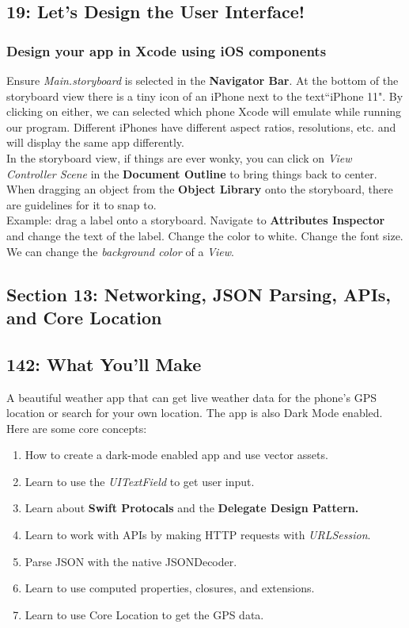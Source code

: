 \documentclass[12pt, letterpaper]{article}
\begin{document}
\subsection*{19: Let's Design the User Interface!}

\subsubsection*{Design your app in Xcode using iOS components}

Ensure \emph{Main.storyboard} is selected in the \textbf{Navigator Bar}. At the bottom of the storyboard
view there is a tiny icon of an iPhone next to the text``iPhone 11". By clicking on either, we can
selected which phone Xcode will emulate while running our program. Different iPhones have different
aspect ratios, resolutions, etc. and will display the same app differently. \\

In the storyboard view, if things are ever wonky, you can click on \emph{View Controller Scene} in the
\textbf{Document Outline} to bring things back to center. When dragging an object from the
\textbf{Object Library} onto the storyboard, there are guidelines for it to snap to. \\ 

Example: drag a label onto a storyboard. Navigate to \textbf{Attributes Inspector} and change the
text of the label. Change the color to white. Change the font size. We can change the \emph{background
color} of a \emph{View}.

\subsection*{Section 13: Networking, JSON Parsing, APIs, and Core Location}

\subsection*{142: What You'll Make}

A beautiful weather app that can get live weather data for the phone's GPS location or search for your own location.
The app is also Dark Mode enabled. Here are some core concepts:

\begin{enumerate}
    \itemsep0em
    \item{How to create a dark-mode enabled app and use vector assets.}
    \item{Learn to use the \emph{UITextField} to get user input.}
    \item{Learn about \textbf{Swift Protocals} and the \textbf{Delegate Design Pattern.}}
    \item{Learn to work with APIs by making HTTP requests with \emph{URLSession}.}
    \item{Parse JSON with the native JSONDecoder.}
    \item{Learn to use computed properties, closures, and extensions.}
    \item{Learn to use Core Location to get the GPS data.}
\end{enumerate}
\end{document}
